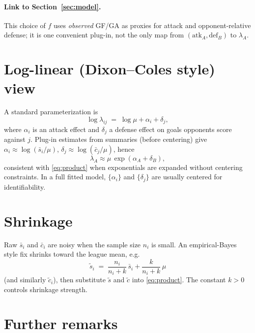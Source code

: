 \documentclass[11pt,a4paper]{article}
\begin{document}
\paragraph{Link to Section~\ref{sec:model}.}
This choice of $f$ uses \emph{observed} GF/GA as proxies for attack and opponent-relative defense; it is one convenient plug-in, not the only map from $(\mathrm{atk}_A,\mathrm{def}_B)$ to $\lambda_A$.

\section{Log-linear (Dixon--Coles style) view}

A standard parameterization is
\begin{equation*}
  \log \lambda_{ij} \;=\; \log \mu + \alpha_i + \delta_j,
\end{equation*}
where $\alpha_i$ is an attack effect and $\delta_j$ a defense effect on goals opponents score against $j$.
Plug-in estimates from summaries (before centering) give
$\alpha_i \approx \log(\bar{s}_i/\mu)$,
$\delta_j \approx \log(\bar{c}_j/\mu)$, hence
\begin{equation*}
  \lambda_A \approx \mu\,\exp(\alpha_A + \delta_B),
\end{equation*}
consistent with \eqref{eq:product} when exponentials are expanded without centering constraints.
In a full fitted model, $\{\alpha_i\}$ and $\{\delta_j\}$ are usually centered for identifiability.

\section{Shrinkage}

Raw $\bar{s}_i$ and $\bar{c}_i$ are noisy when the sample size $n_i$ is small.
An empirical-Bayes style fix shrinks toward the league mean, e.g.
\begin{equation*}
  \tilde{s}_i \;=\; \frac{n_i}{n_i + k}\,\bar{s}_i + \frac{k}{n_i + k}\,\mu
\end{equation*}
(and similarly $\tilde{c}_i$), then substitute $\tilde{s}$ and $\tilde{c}$ into \eqref{eq:product}.
The constant $k > 0$ controls shrinkage strength.

\section{Further remarks}
\end{document}
